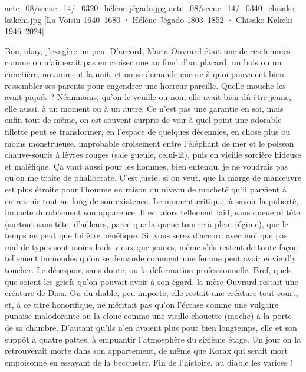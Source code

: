 %
%
%
%
{acte_08/scene_14/_0320_hélène-jégado.jpg}%
{acte_08/scene_14/_0340_chisako-kakehi.jpg}%
[La Voisin \textup{1640--1680} · Hélène Jégado \textup{1803--1852} · Chisako Kakehi \textup{1946--2024}]%

Bon, okay, j’exagère un peu. D’accord, Maria Ouvrard était une de ces femmes comme on n’aimerait pas en croiser une au fond d’un placard, un bois ou un cimetière, notamment la nuit, et on se demande encore à quoi pouvaient bien ressembler ses parents pour engendrer une horreur pareille. Quelle mouche les avait piqués ? Néanmoins, qu’on le veuille ou non, elle avait bien dû être jeune, elle aussi, à un moment ou à un autre. Ce n’est pas une garantie en soi, mais enfin tout de même, on est souvent surpris de voir à quel point une adorable fillette peut se transformer, en l’espace de quelques décennies, en chose plus ou moins monstrueuse, improbable croisement entre l’éléphant de mer et le poisson chauve-souris à lèvres rouges (sale gueule, celui-là), puis en vieille sorcière hideuse et maléfique. Ça vaut aussi pour les hommes, bien entendu, je ne voudrais pas qu’on me traite de phallocrate. C’est juste, si on veut, que la marge de manœuvre est plus étroite pour l’homme en raison du niveau de mocheté qu’il parvient à entretenir tout au long de son existence. Le moment critique, à savoir la puberté, impacte durablement son apparence. Il est alors tellement laid, sans queue ni tête (surtout sans tête, d’ailleurs, parce que la queue tourne à plein régime), que le temps ne peut que lui être bénéfique. Si, vous serez d’accord avec moi que pas mal de types sont moins laids vieux que jeunes, même s’ils restent de toute façon tellement immondes qu’on se demande comment une femme peut avoir envie d’y toucher. Le désespoir, sans doute, ou la déformation professionnelle. Bref, quels que soient les griefs qu’on pouvait avoir à son égard, la mère Ouvrard restait une créature de Dieu. Ou du diable, peu importe, elle restait une créature tout court, et, à ce titre honorifique, ne méritait pas qu’on l’écrase comme une vulgaire punaise malodorante ou la cloue comme une vieille chouette (moche) à la porte de sa chambre. D’autant qu’ils n’en avaient plus pour bien longtemps, elle et son suppôt à quatre pattes, à empuantir l’atmosphère du sixième étage. Un jour on la retrouverait morte dans son appartement, de même que Korax qui serait mort empoisonné en essayant de la becqueter. Fin de l’histoire, au diable les varices !


